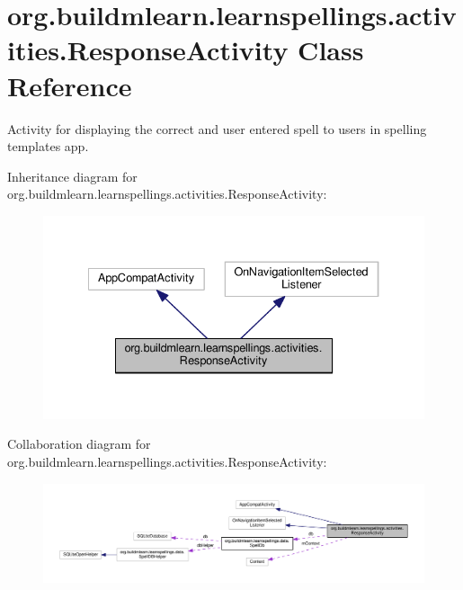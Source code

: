 \hypertarget{classorg_1_1buildmlearn_1_1learnspellings_1_1activities_1_1ResponseActivity}{}\section{org.\+buildmlearn.\+learnspellings.\+activities.\+Response\+Activity Class Reference}
\label{classorg_1_1buildmlearn_1_1learnspellings_1_1activities_1_1ResponseActivity}


Activity for displaying the correct and user entered spell to users in spelling template\textquotesingle{}s app.  




Inheritance diagram for org.\+buildmlearn.\+learnspellings.\+activities.\+Response\+Activity\+:
\nopagebreak
\begin{figure}[H]
\begin{center}
\leavevmode
\includegraphics[width=334pt]{classorg_1_1buildmlearn_1_1learnspellings_1_1activities_1_1ResponseActivity__inherit__graph}
\end{center}
\end{figure}


Collaboration diagram for org.\+buildmlearn.\+learnspellings.\+activities.\+Response\+Activity\+:
\nopagebreak
\begin{figure}[H]
\begin{center}
\leavevmode
\includegraphics[width=350pt]{classorg_1_1buildmlearn_1_1learnspellings_1_1activities_1_1ResponseActivity__coll__graph}
\end{center}
\end{figure}
